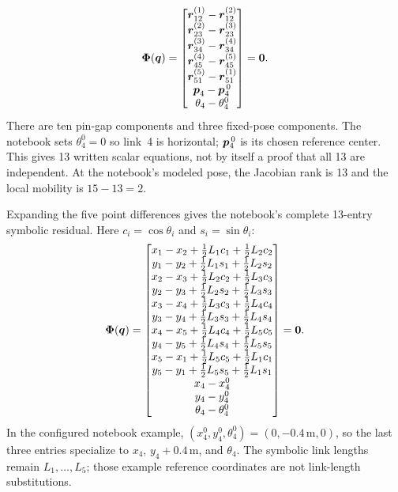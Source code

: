 \documentclass[../main.tex]{subfiles}
\begin{document}
	\begin{equation}
	\boldsymbol{\Phi}(\boldsymbol{q})=
	\begin{bmatrix}
	\boldsymbol{r}_{12}^{(1)}-\boldsymbol{r}_{12}^{(2)}\\
	\boldsymbol{r}_{23}^{(2)}-\boldsymbol{r}_{23}^{(3)}\\
	\boldsymbol{r}_{34}^{(3)}-\boldsymbol{r}_{34}^{(4)}\\
	\boldsymbol{r}_{45}^{(4)}-\boldsymbol{r}_{45}^{(5)}\\
	\boldsymbol{r}_{51}^{(5)}-\boldsymbol{r}_{51}^{(1)}\\
	\boldsymbol{p}_4-\boldsymbol{p}_4^{\,0}\\
	\theta_4-\theta_4^{0}
	\end{bmatrix}=\boldsymbol{0}.
	\label{eq:five-link-phi-ch4}
	\end{equation}
	There are ten pin-gap components and three fixed-pose components. The notebook sets $\theta_4^0=0$ so link~4 is horizontal; $\boldsymbol{p}_4^{\,0}$ is its chosen reference center. This gives 13 written scalar equations, not by itself a proof that all 13 are independent. At the notebook's modeled pose, the Jacobian rank is 13 and the local mobility is $15-13=2$.

	Expanding the five point differences gives the notebook's complete 13-entry symbolic residual. Here $c_i=\cos\theta_i$ and $s_i=\sin\theta_i$:
	\begin{equation}
	\boldsymbol{\Phi}(\boldsymbol{q})=
	\begin{bmatrix}
	x_1-x_2+\frac12L_1c_1+\frac12L_2c_2\\
	y_1-y_2+\frac12L_1s_1+\frac12L_2s_2\\
	x_2-x_3+\frac12L_2c_2+\frac12L_3c_3\\
	y_2-y_3+\frac12L_2s_2+\frac12L_3s_3\\
	x_3-x_4+\frac12L_3c_3+\frac12L_4c_4\\
	y_3-y_4+\frac12L_3s_3+\frac12L_4s_4\\
	x_4-x_5+\frac12L_4c_4+\frac12L_5c_5\\
	y_4-y_5+\frac12L_4s_4+\frac12L_5s_5\\
	x_5-x_1+\frac12L_5c_5+\frac12L_1c_1\\
	y_5-y_1+\frac12L_5s_5+\frac12L_1s_1\\
	x_4-x_4^0\\
	y_4-y_4^0\\
	\theta_4-\theta_4^0
	\end{bmatrix}=\boldsymbol{0}.
	\label{eq:five-link-expanded-phi-ch4}
	\end{equation}
	In the configured notebook example, $(x_4^0,y_4^0,\theta_4^0)=(0,-0.4\,\mathrm m,0)$, so the last three entries specialize to $x_4$, $y_4+0.4\,\mathrm m$, and $\theta_4$. The symbolic link lengths remain $L_1,\ldots,L_5$; those example reference coordinates are not link-length substitutions.
\end{document}
